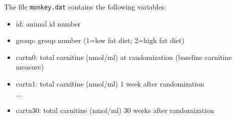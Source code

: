 							\vspace{0.2cm} 
	\noindent  	The file \texttt{monkey.dat} contains the following variables:
							\begin{itemize}
								\item id: animal id number
								\item group: group number (1=low fat diet; 2=high fat diet)
								\item cartn0: total carnitine (nmol/ml) at randomization (baseline carnitine measure)
								\item cartn1: total carnitine (nmol/ml) 1 week after randomization \\
								 \vspace{0.2cm} ...
								\item cartn30: total carnitine (nmol/ml) 30 weeks after randomization
							\end{itemize}
				
				
				
